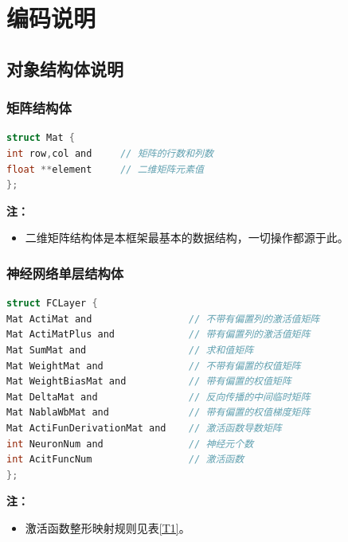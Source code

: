 \documentclass[UTF-8]{progbookcn}
\begin{document}
\chapter{编码说明}

\section{对象结构体说明}
\subsection{矩阵结构体}
\begin{lstlisting}[language=C,caption={矩阵结构体}]
struct Mat {
int row,col and     // 矩阵的行数和列数
float **element     // 二维矩阵元素值
};
\end{lstlisting}

\noindent\textbf{注：}
\begin{itemize}
  \item 二维矩阵结构体是本框架最基本的数据结构，一切操作都源于此。
\end{itemize}


\subsection{神经网络单层结构体}
\begin{lstlisting}[language=C,caption={神经网络单层结构体}]
struct FCLayer {
Mat ActiMat and                 // 不带有偏置列的激活值矩阵
Mat ActiMatPlus and             // 带有偏置列的激活值矩阵
Mat SumMat and                  // 求和值矩阵
Mat WeightMat and               // 不带有偏置的权值矩阵
Mat WeightBiasMat and           // 带有偏置的权值矩阵
Mat DeltaMat and                // 反向传播的中间临时矩阵
Mat NablaWbMat and              // 带有偏置的权值梯度矩阵
Mat ActiFunDerivationMat and    // 激活函数导数矩阵
int NeuronNum and               // 神经元个数
int AcitFuncNum                 // 激活函数
};
\end{lstlisting}

\noindent\textbf{注：}
\begin{itemize}
  \item 激活函数整形映射规则见表\ref{T1}。
\end{itemize}
\end{document}
